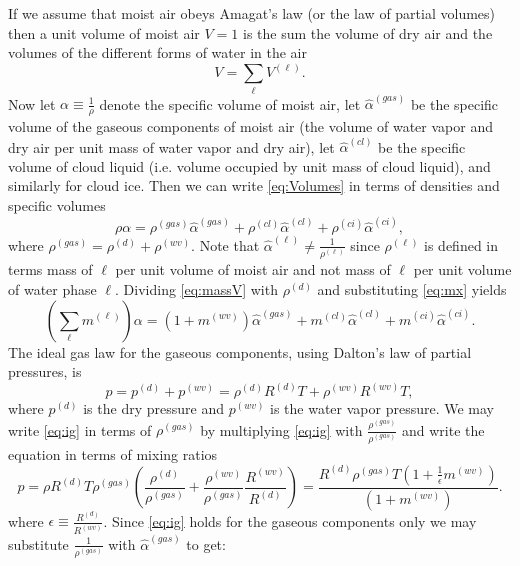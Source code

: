 \documentclass{agujournal}
\begin{document}
If we assume that moist air obeys Amagat's law (or the law of partial volumes) then a unit volume of moist air $V=1$ is the sum the volume of dry air and the volumes of the different forms of water in the air
\begin{equation}
V=\sum_\ell V^{(\ell)}.\label{eq:Volumes}
\end{equation}
Now let $\alpha\equiv \frac{1}{\rho}$ denote the specific volume of moist air, let $\hat{\alpha}^{(gas)}$ be the specific volume of the gaseous components of moist air (the volume of water vapor and dry air per unit mass of water vapor and dry air), let $\hat{\alpha}^{(cl)}$ be the specific volume of cloud liquid (i.e. volume occupied by unit mass of cloud liquid), and similarly for cloud ice. Then we can write \eqref{eq:Volumes} in terms of densities and specific volumes
\begin{equation}
\rho \alpha=\rho^{(gas)}\hat{\alpha}^{(gas)}+\rho^{(cl)}\hat{\alpha}^{(cl)}+\rho^{(ci)}\hat{\alpha}^{(ci)},\label{eq:massV}
\end{equation}
where $\rho^{(gas)}=\rho^{(d)}+\rho^{(wv)}$. Note that $\hat{\alpha}^{(\ell)}\neq \frac{1}{\rho^{(\ell)}}$ since $\rho^{(\ell)}$ is defined in terms mass of $\ell$ per unit volume of moist air and not mass of $\ell$ per unit volume of water phase $\ell$. Dividing \eqref{eq:massV} with $\rho^{(d)}$ and substituting \eqref{eq:mx} yields
\begin{equation}
  \left(\sum_\ell m^{(\ell)}\right) \alpha = \left( 1+m^{(wv)}\right) \hat{\alpha}^{(gas)}+m^{(cl)}\hat{\alpha}^{(cl)}+m^{(ci)}\hat{\alpha}^{(ci)}.\label{eq:vol}
\end{equation}
The ideal gas law for the gaseous components, using Dalton's law of partial pressures, is
\begin{equation}
p=p^{(d)}+p^{(wv)}=\rho^{(d)} R^{(d)} T+\rho^{(wv)} R^{(wv)} T,\label{eq:ig}
\end{equation}
where $p^{(d)}$ is the dry pressure and $p^{(wv)}$ is the water vapor pressure. We may write \eqref{eq:ig} in terms of $\rho^{(gas)}$ by multiplying \eqref{eq:ig} with $\frac{\rho^{(gas)}}{\rho^{(gas)}}$ and write the equation in terms of mixing ratios
\begin{equation}
p=\rho R^{(d)} T\rho^{(gas)}\left( \frac{\rho^{(d)}}{\rho^{(gas)}}+\frac{\rho^{(wv)}}{\rho^{(gas)}}\frac{R^{(wv)}}{R^{(d)}}\right)=\frac{R^{(d)} \rho^{(gas)}T\left( 1+\frac{1}{\epsilon}m^{(wv)}\right)}{\left(1+m^{(wv)}\right)}\label{eq:ig2}.
\end{equation}
where $\epsilon\equiv \frac{R^{(d)}}{R^{(wv)}}$. Since \eqref{eq:ig} holds for the gaseous components only we may substitute $\frac{1}{\rho^{(gas)}}$ with $\hat{\alpha}^{(gas)}$ to get:
\end{document}
